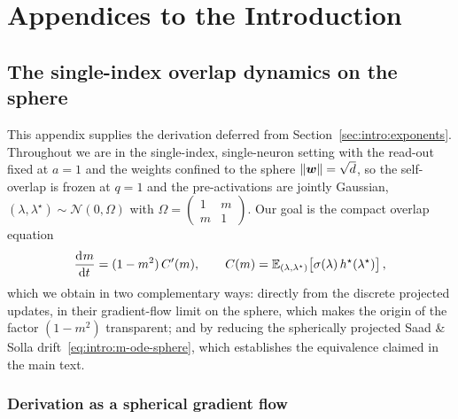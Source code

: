 \chapter[Introduction]{Appendices to the Introduction}
\label{chap:appendix-introduction}

\section{The single-index overlap dynamics on the sphere}
\label{app:intro:m-ode-sphere}

This appendix supplies the derivation deferred from Section~\ref{sec:intro:exponents}. Throughout we are in the single-index, single-neuron setting with the read-out fixed at \(a = 1\) and the weights confined to the sphere \(\left\lVert {\boldsymbol{w}}\right\rVert = \sqrt{d}\), so the self-overlap is frozen at \(q = 1\) and the pre-activations are jointly Gaussian, \((\lambda, \lambda^\star) \sim \mathcal{N}(0, \Omega)\) with \(\Omega = \left(\begin{smallmatrix} 1 & m \\ m & 1\end{smallmatrix}\right)\). Our goal is the compact overlap equation
\begin{equation} \label{app:intro:eq:target}
    \dod{m}{t} = (1 - m^2)\,C'(m), \qquad C(m) = \mathbb{E}_{(\lambda, \lambda^\star)}\!\left[ \sigma(\lambda)\,h^\star(\lambda^\star) \right],
\end{equation}
which we obtain in two complementary ways: directly from the discrete projected updates, in their gradient-flow limit on the sphere, which makes the origin of the factor \((1 - m^2)\) transparent; and by reducing the spherically projected Saad \& Solla drift~\eqref{eq:intro:m-ode-sphere}, which establishes the equivalence claimed in the main text.

\subsection{Derivation as a spherical gradient flow}
\label{app:intro:gradient-flow}

